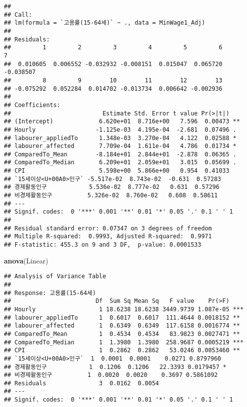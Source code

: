 \documentclass[]{article}
\newenvironment{Shaded}{\begin{snugshade}}{\end{snugshade}}
\newcommand{\KeywordTok}[1]{\textcolor[rgb]{0.13,0.29,0.53}{\textbf{#1}}}
\newcommand{\NormalTok}[1]{#1}
\begin{document}
\begin{verbatim}
## 
## Call:
## lm(formula = `고용률(15-64세)` ~ ., data = MinWage1_Adj)
## 
## Residuals:
##         1         2         3         4         5         6         7 
##  0.010605  0.006552 -0.032932 -0.008151  0.015047  0.065720 -0.038507 
##         8         9        10        11        12        13 
## -0.075292  0.052284  0.014702 -0.013734  0.006642 -0.002936 
## 
## Coefficients:
##                          Estimate Std. Error t value Pr(>|t|)   
## (Intercept)             6.620e+01  8.716e+00   7.596  0.00473 **
## Hourly                 -1.125e-03  4.195e-04  -2.681  0.07496 . 
## labourer_appliedTo      1.348e-03  3.270e-04   4.122  0.02588 * 
## labourer_affected       7.709e-04  1.611e-04   4.786  0.01734 * 
## ComparedTo_Mean        -8.184e+01  2.844e+01  -2.878  0.06365 . 
## ComparedTo_Median       6.209e+01  2.059e+01   3.015  0.05699 . 
## CPI                     5.598e+00  5.866e+00   0.954  0.41033   
## `15세이상<U+00A0>인구` -5.517e-02  8.743e-02  -0.631  0.57283   
## 경제활동인구            5.536e-02  8.777e-02   0.631  0.57296   
## 비경제활동인구          5.326e-02  8.760e-02   0.608  0.58611   
## ---
## Signif. codes:  0 '***' 0.001 '**' 0.01 '*' 0.05 '.' 0.1 ' ' 1
## 
## Residual standard error: 0.07347 on 3 degrees of freedom
## Multiple R-squared:  0.9993, Adjusted R-squared:  0.9971 
## F-statistic: 455.3 on 9 and 3 DF,  p-value: 0.0001533
\end{verbatim}

\begin{Shaded}
\begin{Highlighting}[]
\KeywordTok{anova}\NormalTok{(Linear)}
\end{Highlighting}
\end{Shaded}

\begin{verbatim}
## Analysis of Variance Table
## 
## Response: 고용률(15-64세)
##                        Df  Sum Sq Mean Sq   F value    Pr(>F)    
## Hourly                  1 18.6238 18.6238 3449.9739 1.087e-05 ***
## labourer_appliedTo      1  0.6017  0.6017  111.4644 0.0018152 ** 
## labourer_affected       1  0.6349  0.6349  117.6158 0.0016774 ** 
## ComparedTo_Mean         1  0.4534  0.4534   83.9823 0.0027471 ** 
## ComparedTo_Median       1  1.3980  1.3980  258.9687 0.0005219 ***
## CPI                     1  0.2862  0.2862   53.0246 0.0053460 ** 
## `15세이상<U+00A0>인구`  1  0.0001  0.0001    0.0271 0.8797960    
## 경제활동인구            1  0.1206  0.1206   22.3393 0.0179457 *  
## 비경제활동인구          1  0.0020  0.0020    0.3697 0.5861092    
## Residuals               3  0.0162  0.0054                        
## ---
## Signif. codes:  0 '***' 0.001 '**' 0.01 '*' 0.05 '.' 0.1 ' ' 1
\end{verbatim}
\end{document}
